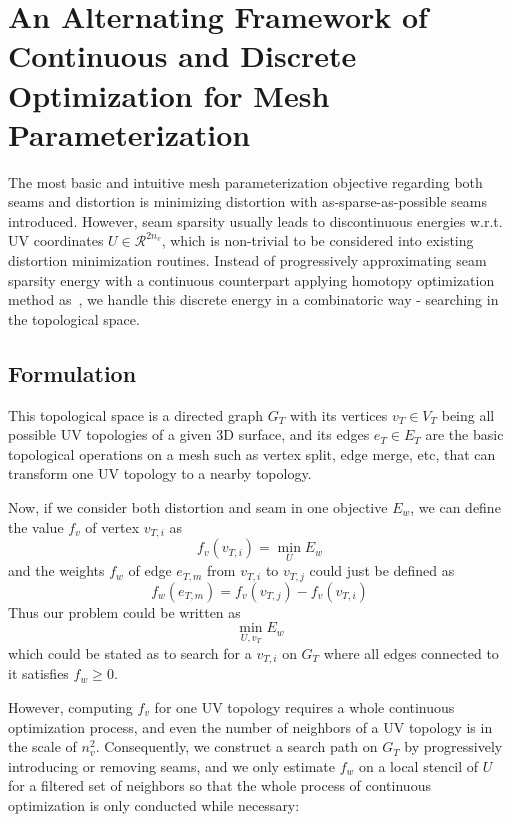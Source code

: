 \section{An Alternating Framework of Continuous and Discrete Optimization for Mesh Parameterization}

The most basic and intuitive mesh parameterization objective regarding both seams and distortion is minimizing distortion with as-sparse-as-possible seams introduced. However, seam sparsity usually leads to discontinuous energies w.r.t. UV coordinates $U \in \mathcal{R}^{2n_v}$, which is non-trivial to be considered into existing distortion minimization routines. Instead of progressively approximating seam sparsity energy with a continuous counterpart applying homotopy optimization method as~\cite{Poranne2017Autocuts}, we handle this discrete energy in a combinatoric way - searching in the topological space.

\subsection{Formulation}

This topological space is a directed graph $G_T$ with its vertices $v_T \in V_T$ being all possible UV topologies of a given 3D surface, and its edges $e_T \in E_T$ are the basic topological operations on a mesh such as vertex split, edge merge, etc, that can transform one UV topology to a nearby topology.

Now, if we consider both distortion and seam in one objective $E_w$, we can define the value $f_v$ of vertex $v_{T,i}$ as 
\[ f_v(v_{T,i}) = \min_{U} E_w \]
and the weights $f_w$ of edge $e_{T,m}$ from $v_{T,i}$ to $v_{T,j}$ could just be defined as 
\[ f_w(e_{T,m}) = f_v(v_{T,j}) - f_v(v_{T,i}) \]
Thus our problem could be written as
\[ \min_{U, v_T} E_w \]
which could be stated as to search for a $v_{T,i}$ on $G_T$ where all edges connected to it satisfies $f_w \geq 0$. 

However, computing $f_v$ for one UV topology requires a whole continuous optimization process, and even the number of neighbors of a UV topology is in the scale of $n_v^2$. Consequently, we construct a search path on $G_T$ by progressively introducing or removing seams, and we only estimate $f_w$ on a local stencil of $U$ for a filtered set of neighbors so that the whole process of continuous optimization is only conducted while necessary:

